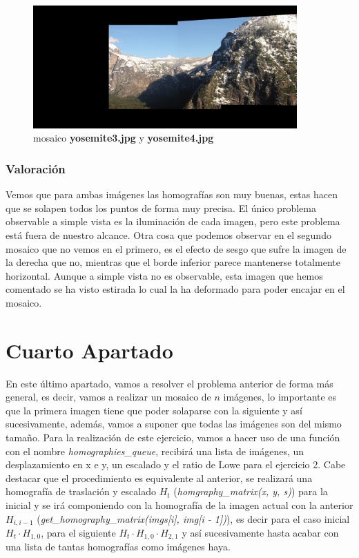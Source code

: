 \documentclass{article}
\begin{document}
\begin{figure}[hbt!]
	\centering
	\includegraphics[width=0.9\textwidth]{../assets/Ejercicio3.png}
	\caption{mosaico \textbf{yosemite3.jpg} y \textbf{yosemite4.jpg}}
\end{figure}

\subsubsection{Valoración}

Vemos que para ambas imágenes las homografías son muy buenas, estas hacen que se solapen todos los puntos de forma muy precisa. El único problema observable a simple vista es la iluminación de cada imagen, pero este problema está fuera de nuestro alcance. Otra cosa que podemos observar en el segundo mosaico que no vemos en el primero, es el efecto de sesgo que sufre la imagen de la derecha que no, mientras que el borde inferior parece mantenerse totalmente horizontal. Aunque a simple vista no es observable, esta imagen que hemos comentado se ha visto estirada lo cual la ha deformado para poder encajar en el mosaico.

\newpage

\section{Cuarto Apartado}

En este último apartado, vamos a resolver el problema anterior de forma más general, es decir, vamos a realizar un mosaico de $n$ imágenes, lo importante es que la primera imagen tiene que poder solaparse con la siguiente y así sucesivamente, además, vamos a suponer que todas las imágenes son del mismo tamaño.
\newline
\newline
Para la realización de este ejercicio, vamos a hacer uso de una función con el nombre \textit{homographies\_queue}, recibirá una lista de imágenes, un desplazamiento en x e y, un escalado y el ratio de Lowe para el ejercicio 2. Cabe destacar que el procedimiento es equivalente al anterior, se realizará una homografía de traslación y escalado $H_t$ (\textit{homgraphy\_matrix(x, y, s)}) para la inicial y se irá componiendo con la homografía de la imagen actual con la anterior $H_{i, i-1}$ (\textit{get\_homography\_matrix(imgs[i], img[i - 1])}), es decir para el caso inicial $H_t \cdot H_{1, 0}$, para el siguiente $H_t \cdot H_{1, 0} \cdot H_{2, 1}$ y así sucesivamente hasta acabar con una lista de tantas homografías como imágenes haya.
\end{document}
